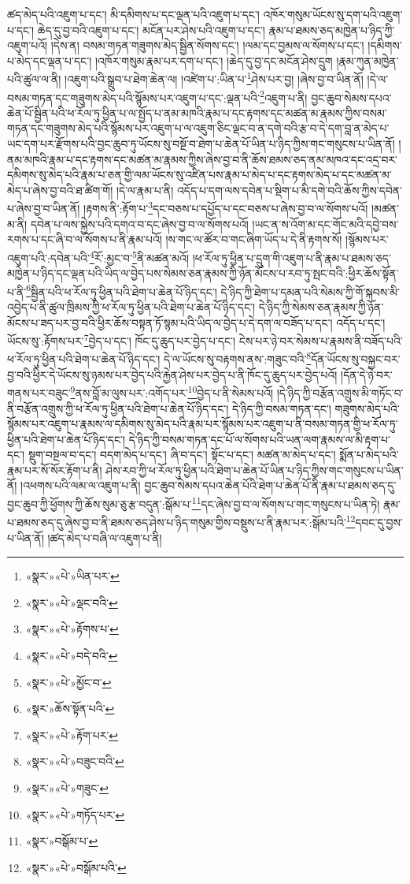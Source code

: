ཚད་མེད་པའི་འཇུག་པ་དང་། མི་དམིགས་པ་དང་ལྡན་པའི་འཇུག་པ་དང་། འཁོར་གསུམ་ཡོངས་སུ་དག་པའི་འཇུག་པ་དང་། ཆེད་དུ་བྱ་བའི་འཇུག་པ་དང་། མངོན་པར་ཤེས་པའི་འཇུག་པ་དང་། རྣམ་པ་ཐམས་ཅད་མཁྱེན་པ་ཉིད་ཀྱི་འཇུག་པའོ། །དེས་ན། བསམ་གཏན་གཟུགས་མེད་སྦྱིན་སོགས་དང་། །ལམ་དང་བྱམས་ལ་སོགས་པ་དང་། །དམིགས་པ་མེད་དང་ལྡན་པ་དང་། །འཁོར་གསུམ་རྣམ་པར་དག་པ་དང་། །ཆེད་དུ་བྱ་དང་མངོན་ཤེས་དྲུག །རྣམ་ཀུན་མཁྱེན་པའི་ཚུལ་ལ་ནི། །འཇུག་པའི་སྒྲུབ་པ་ཐེག་ཆེན་ལ། །འཛེག་པ་:ཡིན་པ་\footnote{«སྣར་»«པེ་»ཡིན་པར་}ཤེས་པར་བྱ། །ཞེས་བྱ་བ་ཡིན་ནོ། །དེ་ལ་བསམ་གཏན་དང་གཟུགས་མེད་པའི་སྙོམས་པར་འཇུག་པ་དང་:ལྡན་པའི་\footnote{«སྣར་»«པེ་»ལྡང་བའི་}འཇུག་པ་ནི། བྱང་ཆུབ་སེམས་དཔའ་ཆེན་པོ་སྦྱིན་པའི་ཕ་རོལ་ཏུ་ཕྱིན་པ་ལ་སྤྱོད་པ་ནམ་མཁའི་རྣམ་པ་དང་རྟགས་དང་མཚན་མ་རྣམས་ཀྱིས་བསམ་གཏན་དང་གཟུགས་མེད་པའི་སྙོམས་པར་འཇུག་པ་ལ་འཇུག་ཅིང་ལྡང་བ་ན་དགེ་བའི་རྩ་བ་དེ་དག་བླ་ན་མེད་པ་ཡང་དག་པར་རྫོགས་པའི་བྱང་ཆུབ་ཏུ་ཡོངས་སུ་བསྔོ་བ་ཐེག་པ་ཆེན་པོ་ཡིན་པ་ཉིད་ཀྱིས་གང་གསུངས་པ་ཡིན་ནོ། །ནམ་མཁའི་རྣམ་པ་དང་རྟགས་དང་མཚན་མ་རྣམས་ཀྱིས་ཞེས་བྱ་བ་ནི་ཆོས་ཐམས་ཅད་ནམ་མཁའ་དང་འདྲ་བར་དམིགས་སུ་མེད་པའི་རྣམ་པ་ཅན་གྱི་ལམ་ཡོངས་སུ་འཛིན་པས་རྣམ་པ་མེད་པ་དང་རྟགས་མེད་པ་དང་མཚན་མ་མེད་པ་ཞེས་བྱ་བའི་ཐ་ཚིག་གོ། །དེ་ལ་རྣམ་པ་ནི། འདོད་པ་དག་ལས་དབེན་པ་སྡིག་པ་མི་དགེ་བའི་ཆོས་ཀྱིས་དབེན་པ་ཞེས་བྱ་བ་ཡིན་ནོ། །རྟགས་ནི་:རྟོག་པ་\footnote{«སྣར་»«པེ་»རྟོགས་པ་}དང་བཅས་པ་དཔྱོད་པ་དང་བཅས་པ་ཞེས་བྱ་བ་ལ་སོགས་པའོ། །མཚན་མ་ནི། དབེན་པ་ལས་སྐྱེས་པའི་དགའ་བ་དང་ཞེས་བྱ་བ་ལ་སོགས་པའོ། །ཡང་ན་ས་འོག་མ་དང་གོང་མའི་དབྱེ་བས་རགས་པ་དང་ཞི་བ་ལ་སོགས་པ་ནི་རྣམ་པའོ། །ས་གང་ལ་ཚོར་བ་གང་ཞིག་ཡོད་པ་དེ་ནི་རྟགས་སོ། །སྙོམས་པར་འཇུག་པའི་:དབེན་པའི་\footnote{«སྣར་»«པེ་»བདེ་བའི་}རོ་:མྱང་བ་\footnote{«སྣར་»«པེ་»མྱོང་བ་}ནི་མཚན་མའོ། །ཕ་རོལ་ཏུ་ཕྱིན་པ་དྲུག་གི་འཇུག་པ་ནི་རྣམ་པ་ཐམས་ཅད་མཁྱེན་པ་ཉིད་དང་ལྡན་པའི་ཡིད་ལ་བྱེད་པས་སེམས་ཅན་རྣམས་ཀྱི་ཉོན་མོངས་པ་རབ་ཏུ་སྤང་བའི་:ཕྱིར་ཆོས་སྟོན་པ་ནི་\footnote{«སྣར་»ཆོས་སྟོན་པའི་}སྦྱིན་པའི་ཕ་རོལ་ཏུ་ཕྱིན་པའི་ཐེག་པ་ཆེན་པོ་ཉིད་དང་། དེ་ཉིད་ཀྱི་ཐེག་པ་དམན་པའི་སེམས་ཀྱི་གོ་སྐབས་མི་འབྱེད་པ་ནི་ཚུལ་ཁྲིམས་ཀྱི་ཕ་རོལ་ཏུ་ཕྱིན་པའི་ཐེག་པ་ཆེན་པོ་ཉིད་དང་། དེ་ཉིད་ཀྱི་སེམས་ཅན་རྣམས་ཀྱི་ཉོན་མོངས་པ་ཟད་པར་བྱ་བའི་ཕྱིར་ཆོས་བསྟན་ཏོ་སྙམ་པའི་ཡིད་ལ་བྱེད་པ་དེ་དག་ལ་བཟོད་པ་དང་། འདོད་པ་དང་། ཡོངས་སུ་:རྟོགས་པར་\footnote{«སྣར་»«པེ་»རྟོག་པར་}བྱེད་པ་དང་། ཁོང་དུ་ཆུད་པར་བྱེད་པ་དང་། ངེས་པར་ཉེ་བར་སེམས་པ་རྣམས་ནི་བཟོད་པའི་ཕ་རོལ་ཏུ་ཕྱིན་པའི་ཐེག་པ་ཆེན་པོ་ཉིད་དང་། དེ་ལ་ཡོངས་སུ་བརྟགས་ནས་:གཟུང་བའི་\footnote{«སྣར་»«པེ་»བཟུང་བའི་}དོན་ཡོངས་སུ་བསྐྱང་བར་བྱ་བའི་ཕྱིར་དེ་ཡོངས་སུ་ཉམས་པར་བྱེད་པའི་རྐྱེན་ཤེས་པར་བྱེད་པ་ནི་ཁོང་དུ་ཆུད་པར་བྱེད་པའོ། །དོན་དེ་ཉེ་བར་གནས་པར་བཟུང་\footnote{«སྣར་»«པེ་»གཟུང་}ནས་བློ་མ་ལུས་པར་:འགོད་པར་\footnote{«སྣར་»«པེ་»གཏོད་པར་}བྱེད་པ་ནི་སེམས་པའོ། །དེ་ཉིད་ཀྱི་བརྩོན་འགྲུས་མི་གཏོང་བ་ནི་བརྩོན་འགྲུས་ཀྱི་ཕ་རོལ་ཏུ་ཕྱིན་པའི་ཐེག་པ་ཆེན་པོ་ཉིད་དང་། དེ་ཉིད་ཀྱི་བསམ་གཏན་དང་། གཟུགས་མེད་པའི་སྙོམས་པར་འཇུག་པ་རྣམས་ལ་དམིགས་སུ་མེད་པའི་རྣམ་པར་སྙོམས་པར་འཇུག་པ་ནི་བསམ་གཏན་གྱི་ཕ་རོལ་ཏུ་ཕྱིན་པའི་ཐེག་པ་ཆེན་པོ་ཉིད་དང་། དེ་ཉིད་ཀྱི་བསམ་གཏན་དང་པོ་ལ་སོགས་པའི་ཡན་ལག་རྣམས་ལ་མི་རྟག་པ་དང་། སྡུག་བསྔལ་བ་དང་། བདག་མེད་པ་དང་། ཞི་བ་དང་། སྟོང་པ་དང་། མཚན་མ་མེད་པ་དང་། སྨོན་པ་མེད་པའི་རྣམ་པར་སོ་སོར་རྟོག་པ་ནི། ཤེས་རབ་ཀྱི་ཕ་རོལ་ཏུ་ཕྱིན་པའི་ཐེག་པ་ཆེན་པོ་ཡིན་པ་ཉིད་ཀྱིས་གང་གསུངས་པ་ཡིན་ནོ། །འཕགས་པའི་ལམ་ལ་འཇུག་པ་ནི། བྱང་ཆུབ་སེམས་དཔའ་ཆེན་པོའི་ཐེག་པ་ཆེན་པོ་ནི་རྣམ་པ་ཐམས་ཅད་དུ་བྱང་ཆུབ་ཀྱི་ཕྱོགས་ཀྱི་ཆོས་སུམ་ཅུ་རྩ་བདུན་:སྒོམ་པ་\footnote{«སྣར་»བསྒོམ་པ་}དང་ཞེས་བྱ་བ་ལ་སོགས་པ་གང་གསུངས་པ་ཡིན་ཏེ། རྣམ་པ་ཐམས་ཅད་དུ་ཞེས་བྱ་བ་ནི་ཐམས་ཅད་ཤེས་པ་ཉིད་གསུམ་གྱིས་བསྡུས་པ་ནི་རྣམ་པར་:སྒོམ་པའི་\footnote{«སྣར་»«པེ་»བསྒོམ་པའི་}དབང་དུ་བྱས་པ་ཡིན་ནོ། །ཚད་མེད་པ་བཞི་ལ་འཇུག་པ་ནི། 